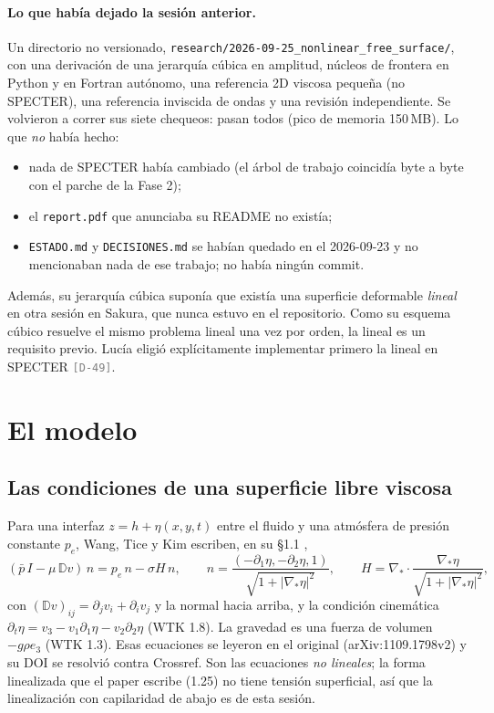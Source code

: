 \documentclass[11pt,a4paper]{article}
\newcommand{\etq}[1]{\textcolor{gray}{\texttt{[#1]}}}
\newcommand{\archivo}[1]{\nolinkurl{#1}}
\begin{document}
\paragraph{Lo que había dejado la sesión anterior.} Un directorio no versionado,
\archivo{research/2026-09-25_nonlinear_free_surface/}, con una derivación de una
jerarquía cúbica en amplitud, núcleos de frontera en Python y en Fortran autónomo, una
referencia 2D viscosa pequeña (no SPECTER), una referencia inviscida de ondas y una revisión
independiente. Se volvieron a correr sus siete chequeos: pasan todos (pico de memoria
150\,MB). Lo que \emph{no} había hecho:
\begin{itemize}
\item nada de SPECTER había cambiado (el árbol de trabajo coincidía byte a byte con el
  parche de la Fase 2);
\item el \archivo{report.pdf} que anunciaba su README no existía;
\item \archivo{ESTADO.md} y \archivo{DECISIONES.md} se habían quedado en el 2026-09-23 y no
  mencionaban nada de ese trabajo; no había ningún commit.
\end{itemize}
Además, su jerarquía cúbica suponía que existía una superficie deformable \emph{lineal}
en otra sesión en Sakura, que nunca estuvo en el repositorio. Como su esquema cúbico
resuelve el mismo problema lineal una vez por orden, la lineal es un requisito previo.
Lucía eligió explícitamente implementar primero la lineal en SPECTER \etq{D-49}.

\section{El modelo}

\subsection{Las condiciones de una superficie libre viscosa}

Para una interfaz $z=h+\eta(x,y,t)$ entre el fluido y una atmósfera de presión constante
$p_e$, Wang, Tice y Kim escriben, en su §1.1 \cite{wtk2014},
\begin{equation}
(\bar p\,I-\mu\,\mathbb{D}v)\,n = p_e\,n-\sigma H\,n,\qquad
n=\frac{(-\partial_1\eta,-\partial_2\eta,1)}{\sqrt{1+|\nabla_*\eta|^2}},\qquad
H=\nabla_*\cdot\frac{\nabla_*\eta}{\sqrt{1+|\nabla_*\eta|^2}},
\tag{WTK 1.4--1.6}
\end{equation}
con $(\mathbb{D}v)_{ij}=\partial_jv_i+\partial_iv_j$ y la normal hacia arriba, y la
condición cinemática $\partial_t\eta=v_3-v_1\partial_1\eta-v_2\partial_2\eta$ (WTK 1.8).
La gravedad es una fuerza de volumen $-g\rho e_3$ (WTK 1.3). Esas ecuaciones se leyeron en
el original (arXiv:1109.1798v2) y su DOI se resolvió contra Crossref. Son las ecuaciones
\emph{no lineales}; la forma linealizada que el paper escribe (1.25) no tiene tensión
superficial, así que la linealización con capilaridad de abajo es de esta sesión.
\end{document}
